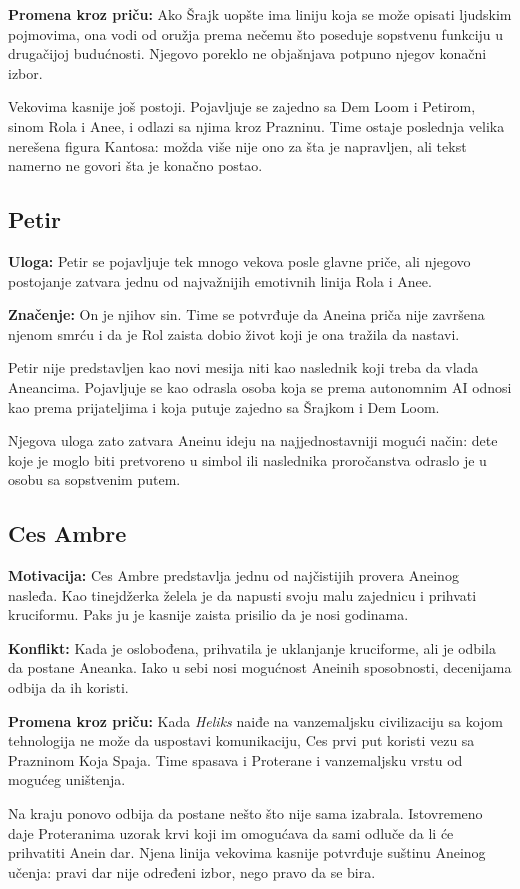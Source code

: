 \textbf{Promena kroz priču:} Ako Šrajk uopšte ima liniju koja se može opisati ljudskim pojmovima, ona vodi od oružja prema nečemu što poseduje sopstvenu funkciju u drugačijoj budućnosti. Njegovo poreklo ne objašnjava potpuno njegov konačni izbor.

Vekovima kasnije još postoji. Pojavljuje se zajedno sa Dem Loom i Petirom, sinom Rola i Anee, i odlazi sa njima kroz Prazninu. Time ostaje poslednja velika nerešena figura Kantosa: možda više nije ono za šta je napravljen, ali tekst namerno ne govori šta je konačno postao.


\subsection*{Petir}

\textbf{Uloga:} Petir se pojavljuje tek mnogo vekova posle glavne priče, ali njegovo postojanje zatvara jednu od najvažnijih emotivnih linija Rola i Anee.

\textbf{Značenje:} On je njihov sin. Time se potvrđuje da Aneina priča nije završena njenom smrću i da je Rol zaista dobio život koji je ona tražila da nastavi.

Petir nije predstavljen kao novi mesija niti kao naslednik koji treba da vlada Aneancima. Pojavljuje se kao odrasla osoba koja se prema autonomnim AI odnosi kao prema prijateljima i koja putuje zajedno sa Šrajkom i Dem Loom.

Njegova uloga zato zatvara Aneinu ideju na najjednostavniji mogući način: dete koje je moglo biti pretvoreno u simbol ili naslednika proročanstva odraslo je u osobu sa sopstvenim putem.


\subsection*{Ces Ambre}

\textbf{Motivacija:} Ces Ambre predstavlja jednu od najčistijih provera Aneinog nasleđa. Kao tinejdžerka želela je da napusti svoju malu zajednicu i prihvati kruciformu. Paks ju je kasnije zaista prisilio da je nosi godinama.

\textbf{Konflikt:} Kada je oslobođena, prihvatila je uklanjanje kruciforme, ali je odbila da postane Aneanka. Iako u sebi nosi mogućnost Aneinih sposobnosti, decenijama odbija da ih koristi.

\textbf{Promena kroz priču:} Kada \emph{Heliks} naiđe na vanzemaljsku civilizaciju sa kojom tehnologija ne može da uspostavi komunikaciju, Ces prvi put koristi vezu sa Prazninom Koja Spaja. Time spasava i Proterane i vanzemaljsku vrstu od mogućeg uništenja.

Na kraju ponovo odbija da postane nešto što nije sama izabrala. Istovremeno daje Proteranima uzorak krvi koji im omogućava da sami odluče da li će prihvatiti Anein dar. Njena linija vekovima kasnije potvrđuje suštinu Aneinog učenja: pravi dar nije određeni izbor, nego pravo da se bira.